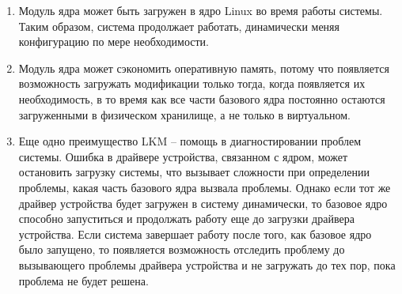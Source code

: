 \begin{enumerate}
    \item Модуль ядра может быть загружен в ядро Linux во время работы системы. \vspace{1mm}\\
    Таким образом, система продолжает работать, динамически меняя конфигурацию по мере необходимости.
    \item Модуль ядра может сэкономить оперативную память, потому что появляется возможность загружать модификации только тогда, когда появляется их необходимость,
    в то время как все части базового ядра постоянно остаются загруженными в физическом хранилище, а не только в виртуальном.
    \item Еще одно преимущество LKM -- помощь в диагностировании проблем системы.
    Ошибка в драйвере устройства, связанном с ядром, может остановить загрузку системы, что вызывает сложности при определении проблемы, какая часть базового ядра вызвала проблемы.
    Однако если тот же драйвер устройства будет загружен в систему динамически,
    то базовое ядро способно запуститься и продолжать работу еще до загрузки драйвера устройства.
    Если система завершает работу после того, как базовое ядро было запущено,
    то появляется возможность отследить проблему до вызывающего проблемы драйвера устройства и не загружать до тех пор, пока проблема не будет решена.\\
\end{enumerate}

